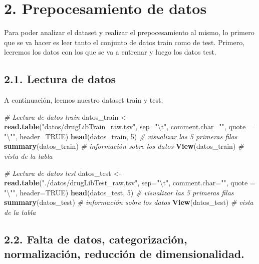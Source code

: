 \documentclass[spanish,]{article}
\newenvironment{Shaded}{\begin{snugshade}}{\end{snugshade}}
\newcommand{\KeywordTok}[1]{\textcolor[rgb]{0.13,0.29,0.53}{\textbf{#1}}}
\newcommand{\DataTypeTok}[1]{\textcolor[rgb]{0.13,0.29,0.53}{#1}}
\newcommand{\DecValTok}[1]{\textcolor[rgb]{0.00,0.00,0.81}{#1}}
\newcommand{\CharTok}[1]{\textcolor[rgb]{0.31,0.60,0.02}{#1}}
\newcommand{\StringTok}[1]{\textcolor[rgb]{0.31,0.60,0.02}{#1}}
\newcommand{\CommentTok}[1]{\textcolor[rgb]{0.56,0.35,0.01}{\textit{#1}}}
\newcommand{\OtherTok}[1]{\textcolor[rgb]{0.56,0.35,0.01}{#1}}
\newcommand{\NormalTok}[1]{#1}
\begin{document}
\section{2. Prepocesamiento de datos}\label{prepocesamiento-de-datos}

Para poder analizar el dataset y realizar el prepocesamiento al mismo,
lo primero que se va hacer es leer tanto el conjunto de datos train como
de test. Primero, leeremos los datos con los que se va a entrenar y
luego los datos test.

\subsection{2.1. Lectura de datos}\label{lectura-de-datos}

A continuación, leemos nuestro dataset train y test:

\begin{Shaded}
\begin{Highlighting}[]
\CommentTok{# Lectura de datos train}
\NormalTok{datos_train <-}\StringTok{ }\KeywordTok{read.table}\NormalTok{(}\StringTok{"datos/drugLibTrain_raw.tsv"}\NormalTok{, }\DataTypeTok{sep=}\StringTok{"}\CharTok{\textbackslash{}t}\StringTok{"}\NormalTok{, }\DataTypeTok{comment.char=}\StringTok{""}\NormalTok{, }
                          \DataTypeTok{quote =} \StringTok{"}\CharTok{\textbackslash{}"}\StringTok{"}\NormalTok{, }\DataTypeTok{header=}\OtherTok{TRUE}\NormalTok{)}
\KeywordTok{head}\NormalTok{(datos_train, }\DecValTok{5}\NormalTok{) }\CommentTok{# visualizar las 5 primeras filas}
\KeywordTok{summary}\NormalTok{(datos_train) }\CommentTok{# información sobre los datos}
\KeywordTok{View}\NormalTok{(datos_train)    }\CommentTok{# vista de la tabla }

\CommentTok{# Lectura de datos test}
\NormalTok{datos_test <-}\StringTok{ }\KeywordTok{read.table}\NormalTok{(}\StringTok{"./datos/drugLibTest_raw.tsv"}\NormalTok{, }\DataTypeTok{sep=}\StringTok{"}\CharTok{\textbackslash{}t}\StringTok{"}\NormalTok{, }\DataTypeTok{comment.char=}\StringTok{""}\NormalTok{, }
                         \DataTypeTok{quote =} \StringTok{"}\CharTok{\textbackslash{}"}\StringTok{"}\NormalTok{, }\DataTypeTok{header=}\OtherTok{TRUE}\NormalTok{)}
\KeywordTok{head}\NormalTok{(datos_test, }\DecValTok{5}\NormalTok{) }\CommentTok{# visualizar las 5 primeras filas}
\KeywordTok{summary}\NormalTok{(datos_test) }\CommentTok{# información sobre los datos}
\KeywordTok{View}\NormalTok{(datos_test)    }\CommentTok{# vista de la tabla }
\end{Highlighting}
\end{Shaded}

\subsection{2.2. Falta de datos, categorización, normalización,
reducción de
dimensionalidad.}\label{falta-de-datos-categorizacion-normalizacion-reduccion-de-dimensionalidad.}
\end{document}
